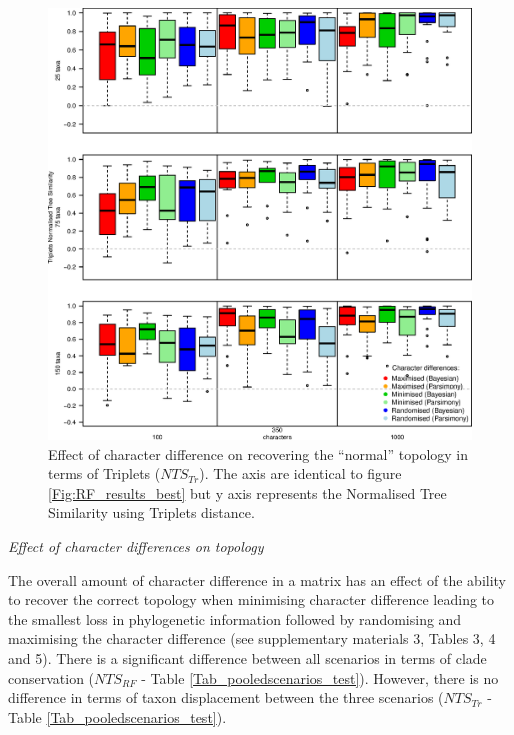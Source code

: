 \documentclass[12pt,letterpaper]{article}
\renewcommand{\subsection}[1]{%
\bigskip
\begin{center}
\begin{large}
\normalfont\itshape #1
\end{large}
\end{center}}
\begin{document}
\begin{figure}[!htbp]
\centering
   \includegraphics[width=1\textwidth]{Tr_results_best.eps}
\caption{Effect of character difference on recovering the ``normal'' topology in terms of Triplets ($NTS_{Tr}$). The axis are identical to figure \ref{Fig:RF_results_best} but y axis represents the Normalised Tree Similarity using Triplets distance.}
\label{Fig:Tr_results_best}
\end{figure}

\subsection{Effect of character differences on topology}
The overall amount of character difference in a matrix has an effect of the ability to recover the correct topology when minimising character difference leading to the smallest loss in phylogenetic information followed by randomising and maximising the character difference (see supplementary materials 3, Tables 3, 4 and 5).
There is a significant difference between all scenarios in terms of clade conservation ($NTS_{RF}$ - Table \ref{Tab_pooledscenarios_test}).
However, there is no difference in terms of taxon displacement between the three scenarios ($NTS_{Tr}$ - Table \ref{Tab_pooledscenarios_test}).
\end{document}
